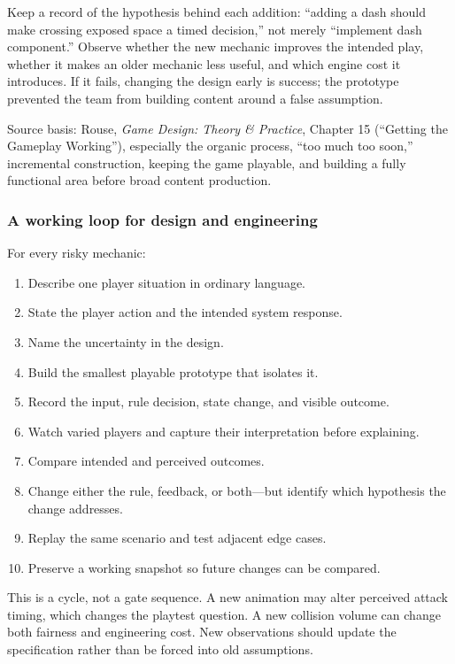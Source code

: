 Keep a record of the hypothesis behind each addition: ``adding a dash should make crossing exposed space a timed decision,'' not merely ``implement dash component.'' Observe whether the new mechanic improves the intended play, whether it makes an older mechanic less useful, and which engine cost it introduces. If it fails, changing the design early is success; the prototype prevented the team from building content around a false assumption.

Source basis: Rouse, \emph{Game Design: Theory \& Practice}, Chapter 15 (``Getting the Gameplay Working''), especially the organic process, ``too much too soon,'' incremental construction, keeping the game playable, and building a fully functional area before broad content production.

\subsubsection{A working loop for design and engineering}\label{a-working-loop-for-design-and-engineering}

For every risky mechanic:

\begin{enumerate}
\def\labelenumi{\arabic{enumi}.}
\tightlist
\item
  Describe one player situation in ordinary language.
\item
  State the player action and the intended system response.
\item
  Name the uncertainty in the design.
\item
  Build the smallest playable prototype that isolates it.
\item
  Record the input, rule decision, state change, and visible outcome.
\item
  Watch varied players and capture their interpretation before explaining.
\item
  Compare intended and perceived outcomes.
\item
  Change either the rule, feedback, or both---but identify which hypothesis the change addresses.
\item
  Replay the same scenario and test adjacent edge cases.
\item
  Preserve a working snapshot so future changes can be compared.
\end{enumerate}

This is a cycle, not a gate sequence. A new animation may alter perceived attack timing, which changes the playtest question. A new collision volume can change both fairness and engineering cost. New observations should update the specification rather than be forced into old assumptions.

